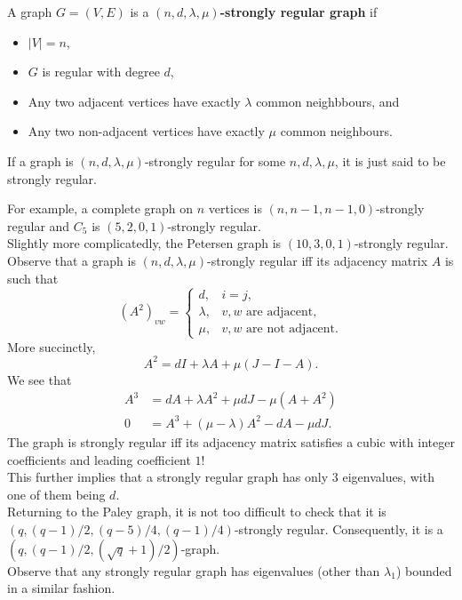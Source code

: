 			\begin{fdef}
				A graph $G=(V,E)$ is a \textbf{$(n,d,\lambda,\mu)$-strongly regular graph} if
				\begin{itemize}
					\item $|V|=n$,
					\item $G$ is regular with degree $d$,
					\item Any two adjacent vertices have exactly $\lambda$ common neighbbours, and
					\item Any two non-adjacent vertices have exactly $\mu$ common neighbours.
				\end{itemize}
				If a graph is $(n,d,\lambda,\mu)$-strongly regular for some $n,d,\lambda,\mu$, it is just said to be strongly regular.
			\end{fdef}

			For example, a complete graph on $n$ vertices is $(n,n-1,n-1,0)$-strongly regular and $C_5$ is $(5,2,0,1)$-strongly regular.\\
			Slightly more complicatedly, the Petersen graph is $(10,3,0,1)$-strongly regular.\\

			Observe that a graph is $(n,d,\lambda,\mu)$-strongly regular iff its adjacency matrix $A$ is such that
			\[
			(A^2)_{vw} =
			\begin{cases}
				d, & i=j, \\
				\lambda, & v,w\text{ are adjacent}, \\
				\mu, & v,w\text{ are not adjacent}.
			\end{cases}
			\]
			More succinctly,
			\[ A^2 = d I + \lambda A + \mu(J - I - A). \]
			We see that
			\begin{align*}
				A^3 &= d A + \lambda A^2 + \mu d J - \mu(A+A^2) \\
				0 &= A^3 + (\mu-\lambda)A^2 - d A - \mu d J.
			\end{align*}
			The graph is strongly regular iff its adjacency matrix satisfies a cubic with integer coefficients and leading coefficient $1$!\\
			This further implies that a strongly regular graph has only $3$ eigenvalues, with one of them being $d$.\\

			Returning to the Paley graph, it is not too difficult to check that it is $( q , (q-1)/2 , (q-5)/4 , (q-1)/4 )$-strongly regular. Consequently, it is a $\left( q , (q-1)/2, (\sqrt{q}+1)/2 \right)$-graph.\\
			Observe that any strongly regular graph has eigenvalues (other than $\lambda_1$) bounded in a similar fashion.\\

